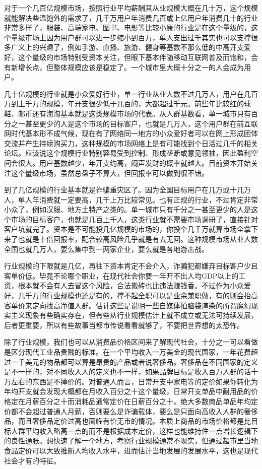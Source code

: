 \documentclass[]{tufte-book}
\begin{document}
对于一个几百亿规模市场，按照行业平均薪酬其从业规模大概在几十万，这个规模就能解决些温饱外的需求了，几千万用户年消费几百或上亿用户年消费几十的行业非常多样了，服装、高端家电、图书、电影等比较小康的行业是在这个量级的，这个量级市场上因为用户群可以进一步缩小到百万，单人支出过千其实也可以支撑很多广义上的兴趣了，例如手游、直播、旅游、健身等基数不那么低的中高开支爱好，这个量级的市场特别受资本关注，但眼下基本伴随移动互联网普及而饱和，会有新增长点，但整体规模应该是稳定了。一个城市里大概十分之一的人会成为用户。

几十亿规模的行业就是小众爱好行业，单一行业从业人数不过几万人，用户在几百万到上千万的规模，年开支很少低于几百的，大都超过千元。前些年比较红的球鞋、邮币还有海淘基本就是这类规模市场的代表。从人群基数看，单一城市只有百分之一甚至更少的人是这个市场的目标客户，也就是几万人，这个用户群在前互联网时代基本形不成气候，现在有了网络同一地方的小众爱好者可以在网上形成团体交流并产生持续购买力，这种规模的市场网络上是有可能找到个日活过几千的相关论坛。应该说这个规模行业特别容易受到控制、形成垄断或意见领袖，因此盈利空间会很大。用户基数越少，年开支约高，闷声发财的概率就越大。目前资本开始关注这个量级市场，虽然总盘子不算大，但回报率可以做到很不错。

到了几亿规模的行业基本就是诈骗重灾区了。因为全国目标用户在几万或十几万人，单人年消费就一定要高，几千上万比较常见。也有正规的行业，不过肯定非常小众了，例如汉服、地方土特产之类的。单一城市只有千分之一甚至更少的人是这个市场的目标客户，也就是几百上千人，这类行业就不需要市场调研了，直接针对客户坑就完了。资本是不可能投几亿规模的市场的，你投个几千万就算市场全拿下来了也就是十倍回报率，配合较高风险几乎就是有去无回。这种规模市场从业人数全国也就几万人，要么集中到一两家企业，要么就是各地游击战。

行业规模的下限就是几亿，再往下资本肯定不会介入，诈骗犯都嫌弃目标客户少且客单价低。毕竟不论哪个职业，在现代社会你要一年开不出人均GDP以上的工资，根本就不会有人去冒这个风险，合法搬砖也比违法赚钱香。不过作为小众爱好，几千万的行业规模也还是有的，撑不起全职可以是业余兼职做，有的则会抬高客单价来定向找高净值人群。估计这些是说明一些自媒体拍脑袋渲染的所谓魔幻现实主义现象有些确实存在，但有些从行业规模估计上就不成立或无法可持续发展，后者更重要，所以有些故事当都市传说看看就够了，不要把世界想的太恐怖。

除了行业规模，我们也可以从消费品价格区间来了解现代社会，十分之一可以看做是区分现代工业品贵贱的标准。在一个平均收入一万美金的现代国家，一年花费超过一千美元的物品都可以算是昂贵的产品或者说奢侈品。奢侈品在不同国家的定义是不一样的，对不同收入人的定义也不一样，如果品牌目标是收入百万人群的话十万左右的东西是不掉价的。对普通人而言，日常开支中家电等的定价如果你转化为年均开支就会发现大概都在月收入百分之十这个量级，日常开支单品中耐用品的价格定在月薪百分之十而消耗品通常定价在日薪百分之十。绝大多数商品单品年均定价都不会超过普通人月薪，否则要么是诈骗载体，要么是只面向高收入人群的奢侈品，而且奢侈品定价过高也面临有价无市的情况。本质上商品的市场价格都是比目标人群平均收入略高一点的而不是根据成本定价，这样也能维持住一点增长逻辑下的良性通胀。想快速了解一个地方，考察行业规模通常不现实，但通过超市里当地食品定价可以大致推断人均收入水平，进而估计当地发展的发展水平，这也是现代社会才有的特征。
\end{document}
